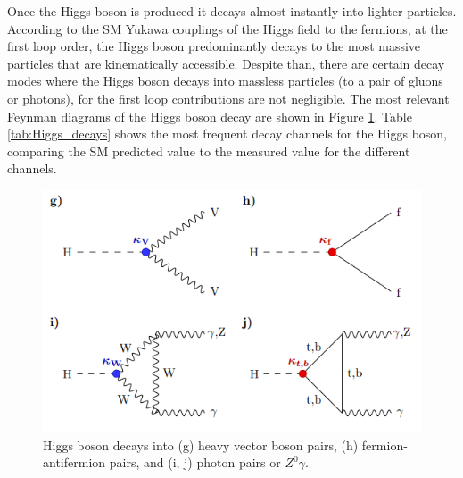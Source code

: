 Once the Higgs boson is produced it decays almost instantly into lighter particles. According to the SM Yukawa couplings of the Higgs field to the fermions, at the first loop order, the Higgs boson predominantly decays to the most massive particles that are kinematically accessible. Despite than, there are certain decay modes where the Higgs boson decays into massless particles (to a pair of gluons or photons), for the first loop contributions are not negligible. The most relevant Feynman diagrams of the Higgs boson decay are shown in Figure \ref{fig:Higgs_decays}. Table \ref{tab:Higgs_decays} shows the most frequent decay channels for the Higgs boson, comparing the SM predicted value to the measured value for the different channels.


\begin{figure}[!ht]
    \vspace*{-0.0cm}
    \centering
    \setlength{\mylength}{\textwidth}
    \includegraphics[width=0.53\mylength]{resources/Higgs_decays.png}
    \vspace*{-0.0cm}
    \caption{Higgs boson decays into (g) heavy vector boson pairs, (h) fermion-antifermion pairs, and (i, j)
    photon pairs or $Z^0\gamma$.}
    \label{fig:Higgs_decays}
    \vspace*{-0.0cm}
\end{figure}

